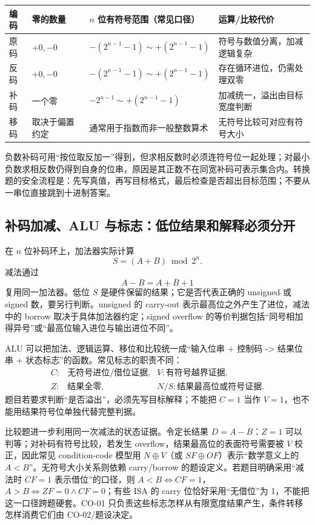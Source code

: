 \documentclass[UTF8,fontset=fandol,11pt,a4paper]{ctexart}
\begin{document}
\begin{center}\small
\begin{tabularx}{\linewidth}{L{1.9cm}L{2.8cm}L{2.4cm}Y}
\toprule
编码 & 零的数量 & $n$ 位有符号范围（常见口径） & 运算/比较代价 \\
\midrule
原码 & $+0,-0$ & $-(2^{n-1}-1)\sim +(2^{n-1}-1)$ & 符号与数值分离，加减逻辑复杂 \\
反码 & $+0,-0$ & $-(2^{n-1}-1)\sim +(2^{n-1}-1)$ & 存在循环进位，仍需处理双零 \\
补码 & 一个零 & $-2^{n-1}\sim +(2^{n-1}-1)$ & 加减统一，溢出由目标宽度判断 \\
移码 & 取决于偏置约定 & 通常用于指数而非一般整数算术 & 无符号比较可对应有符号大小 \\
\bottomrule
\end{tabularx}
\end{center}

负数补码可用“按位取反加一”得到，但求相反数时必须连符号位一起处理；对最小负数求相反数仍得到自身的位串，原因是其正数不在同宽补码可表示集合内。转换题的安全流程是：先写真值，再写目标格式，最后检查是否超出目标范围；不要从一串位直接跳到十进制答案。

\subsection{补码加减、ALU 与标志：低位结果和解释必须分开}

在 $n$ 位补码环上，加法器实际计算
\[
S=(A+B)\bmod 2^n.
\]
减法通过
\[
A-B=A+\overline{B}+1
\]
复用同一加法器。低位 $S$ 是硬件保留的结果；它是否代表正确的 unsigned 或 signed 数，要另行判断。unsigned 的 carry-out 表示最高位之外产生了进位，减法中的 borrow 取决于具体加法器约定；signed overflow 的等价判据包括“同号相加得异号”或“最高位输入进位与输出进位不同”。

ALU 可以把加法、逻辑运算、移位和比较统一成“输入位串 + 控制码 -> 结果位串 + 状态标志”的函数。常见标志的职责不同：
\[
\begin{array}{lll}
C:&\text{无符号进位/借位证据},&
V:\text{有符号越界证据},\\
Z:&\text{结果全零},&
N/S:\text{结果最高位或符号证据}.
\end{array}
\]
题目若要求判断“是否溢出”，必须先写目标解释；不能把 $C=1$ 当作 $V=1$，也不能用结果符号位单独代替完整判据。

比较题进一步利用同一次减法的状态证据。令定长结果 $D=A-B$：$Z=1$ 可以判等；对补码有符号比较，若发生 overflow，结果最高位的表面符号需要被 $V$ 校正，因此常见 condition-code 模型用 $N\oplus V$（或 $SF\oplus OF$）表示“数学意义上的 $A<B$”。无符号大小关系则依赖 carry/borrow 的题设定义。若题目明确采用“减法时 $CF=1$ 表示借位”的口径，则 $A<B\Leftrightarrow CF=1$，$A>B\Leftrightarrow ZF=0\land CF=0$；有些 ISA 的 carry 位恰好采用“无借位”为 1，不能把这一口径跨题硬套。CO-01 只负责这些标志怎样从有限宽度结果产生，条件转移怎样消费它们由 CO-02/题设决定。
\end{document}
